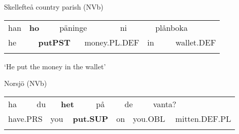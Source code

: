\begin{listWWNumileveli}
\item 

\begin{styleExample}
Skellefteå country parish (NVb)

\end{styleExample}

\end{listWWNumileveli}

\begin{tabular}{llllllllll}
\lsptoprule
han & \multicolumn{2}{l}{{\bfseries ho}

} & \multicolumn{2}{l}{päninge

} & \multicolumn{2}{l}{ni

} & \multicolumn{2}{l}{plånboka

} & \\
\multicolumn{2}{l}{he

} & \multicolumn{2}{l}{{\bfseries putPST}

} & \multicolumn{2}{l}{money.PL.DEF

} & \multicolumn{2}{l}{in

} & \multicolumn{2}{l}{wallet.DEF

}\\
\lspbottomrule
\end{tabular}

\begin{styleTranslation}
‘He put the money in the wallet’

\end{styleTranslation}

\begin{listWWNumileveli}
\item 

\begin{styleExample}
Norsjö (NVb)

\end{styleExample}

\end{listWWNumileveli}

\begin{tabular}{llllllllllll}
\lsptoprule
ha & \multicolumn{2}{l}{du

} & \multicolumn{2}{l}{{\bfseries het}

} & \multicolumn{2}{l}{på

} & \multicolumn{2}{l}{de

} & \multicolumn{2}{l}{vanta?

} & \\
\multicolumn{2}{l}{have.PRS

} & \multicolumn{2}{l}{you

} & \multicolumn{2}{l}{{\bfseries put.SUP}

} & \multicolumn{2}{l}{on

} & \multicolumn{2}{l}{you.OBL

} & \multicolumn{2}{l}{mitten.DEF.PL

}\\
\lspbottomrule
\end{tabular}

